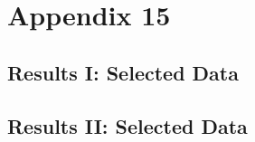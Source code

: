 \chapter{Appendix 15}
\label{a:appendix}

\section{Results I: Selected Data}
\section{Results II: Selected Data}

